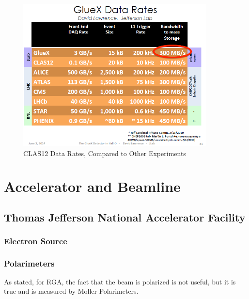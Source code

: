     \begin{figure}[H]
        \centering
        \includegraphics[width=10cm]{Chapters/Ch2-Experiment/clas-12-system/pics/other/good_data_rates_slide.PNG}
        \caption{CLAS12 Data Rates, Compared to Other Experiments }
    \end{figure}

\section{Accelerator and Beamline}
        \subsection{Thomas Jefferson National Accelerator Facility}
            \subsubsection{Electron Source}    
            \subsubsection{Polarimeters}
                    As stated, for RGA, the fact that the beam is polarized is not useful, but it is true and is measured by Moller Polarimeters. 
    
           
    
